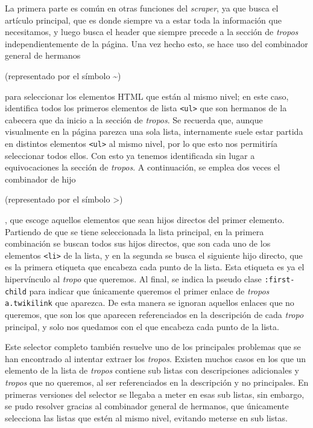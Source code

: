 La primera parte es común en otras funciones del \textit{scraper}, ya que busca
el artículo principal, que es donde siempre va a estar toda la información que
necesitamos, y luego busca el header que siempre precede a la sección de
\textit{tropos} independientemente de la página. Una vez hecho esto, se hace uso
del combinador general de hermanos \cite{mozilla_selectores_2022}
\begin{otherlanguage}{english}(representado por el símbolo
\textasciitilde)\end{otherlanguage} para seleccionar los elementos HTML que
están al mismo nivel; en este caso, identifica todos los primeros elementos de
lista \texttt{<ul>} que son hermanos de la cabecera que da inicio a la sección
de \textit{tropos}. Se recuerda que, aunque visualmente en la página parezca una
sola lista, internamente suele estar partida en distintos elementos \texttt{<ul>} al mismo nivel, por lo que esto nos permitiría seleccionar todos
ellos. Con esto ya tenemos identificada sin lugar a equivocaciones la sección de
\textit{tropos}. A continuación, se emplea dos veces el combinador de hijo
\cite{mozilla_selectores_2022} \begin{otherlanguage}{english}(representado por
el símbolo \textgreater)\end{otherlanguage}, que escoge aquellos elementos que
sean hijos directos del primer elemento. Partiendo de que se tiene seleccionada
la lista principal, en la primera combinación se buscan todos sus hijos
directos, que son cada uno de los elementos \texttt{<li>} de la lista, y en la
segunda se busca el siguiente hijo directo, que es la primera etiqueta que
encabeza cada punto de la lista. Esta etiqueta es ya el hipervínculo al
\textit{tropo} que queremos. Al final, se indica la pseudo clase \texttt{:first-child} para indicar que únicamente queremos el primer enlace de
\textit{tropos} \texttt{a.twikilink} que aparezca. De esta manera se ignoran
aquellos enlaces que no queremos, que son los que aparecen referenciados en la
descripción de cada \textit{tropo} principal, y solo nos quedamos con el que
encabeza cada punto de la lista.

Este selector completo también resuelve uno de los principales problemas que se
han encontrado al intentar extraer los \textit{tropos}. Existen muchos casos en
los que un elemento de la lista de \textit{tropos} contiene sub listas con
descripciones adicionales y \textit{tropos} que no queremos, al ser
referenciados en la descripción y no principales. En primeras versiones del
selector se llegaba a meter en esas sub listas, sin embargo, se pudo resolver
gracias al combinador general de hermanos, que únicamente selecciona las listas
que estén al mismo nivel, evitando meterse en sub listas. 

